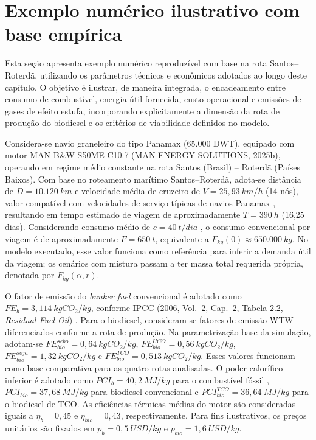 \section{Exemplo numérico ilustrativo com base empírica}

Esta seção apresenta exemplo numérico reproduzível com base na rota Santos--Roterdã, utilizando os parâmetros técnicos e econômicos adotados ao longo deste capítulo. O objetivo é ilustrar, de maneira integrada, o encadeamento entre consumo de combustível, energia útil fornecida, custo operacional e emissões de gases de efeito estufa, incorporando explicitamente a dimensão da rota de produção do biodiesel e os critérios de viabilidade definidos no modelo.

Considera-se navio graneleiro do tipo Panamax (65.000 DWT), equipado com motor MAN B\&W S50ME-C10.7 (MAN ENERGY SOLUTIONS, 2025b), operando em regime médio constante na rota Santos (Brasil) -- Roterdã (Países Baixos). Com base no roteamento marítimo Santos--Roterdã, adota-se distância de $D = 10.120~km$ \cite{searoutes2026} e velocidade média de cruzeiro de $V = 25,93~km/h$ (14 nós), valor compatível com velocidades de serviço típicas de navios Panamax \cite{brown_power_2019}, resultando em tempo estimado de viagem de aproximadamente $T = 390~h$ (16,25 dias). Considerando consumo médio de $c = 40~t/dia$ \cite{marineaffairs2025}, o consumo convencional por viagem é de aproximadamente $F = 650~t$, equivalente a $F_{kg}(0) \approx 650.000~kg$. No modelo executado, esse valor funciona como referência para inferir a demanda útil da viagem; os cenários com mistura passam a ter massa total requerida própria, denotada por $F_{kg}(\alpha,r)$.

O fator de emissão do \emph{bunker fuel} convencional é adotado como $FE_b = 3,114~kgCO_2/kg$, conforme IPCC (2006, Vol.\ 2, Cap.\ 2, Tabela 2.2, \emph{Residual Fuel Oil}) \cite{ipcc2006}. Para o biodiesel, consideram-se fatores de emissão \gls{WTW} diferenciados conforme a rota de produção. Na parametrização-base da simulação, adotam-se $FE_{bio}^{sebo} = 0,64~kgCO_2/kg$, $FE_{bio}^{UCO} = 0,56~kgCO_2/kg$, $FE_{bio}^{soja} = 1,32~kgCO_2/kg$ e $FE_{bio}^{TCO} = 0,513~kgCO_2/kg$. Esses valores funcionam como base comparativa para as quatro rotas analisadas. O poder calorífico inferior é adotado como $PCI_b = 40,2~MJ/kg$ para o combustível fóssil \cite{ipcc2006}, $PCI_{bio} = 37,68~MJ/kg$ para biodiesel convencional \cite{anp_renovacalc} e $PCI_{bio}^{TCO} = 36,64~MJ/kg$ para o biodiesel de \gls{TCO}. As eficiências térmicas médias do motor são consideradas iguais a $\eta_b = 0,45$ e $\eta_{bio} = 0,43$, respectivamente. Para fins ilustrativos, os preços unitários são fixados em $p_b = 0,5~USD/kg$ e $p_{bio} = 1,6~USD/kg$.

